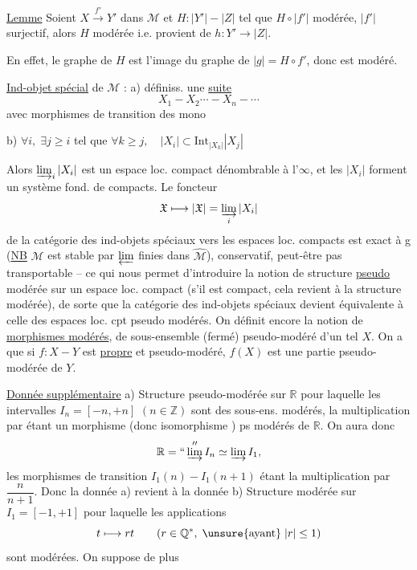 \uline{Lemme} Soient $X\xrightarrow{f'}Y'$ dans $\mathcal M$ et $H:|Y'|-|Z|$ tel que $H\circ|f'|$ modérée,  $|f'|$ surjectif, alors $H$ modérée i.e. provient de $h:Y'\longrightarrow|Z|$.

En effet,  le graphe de $H$ est l'image du graphe de $|g|=H\circ f'$, donc est modéré.


\uline{Ind-objet spécial}\inserted{$*$} de $\mathcal M$ : a) définiss.  une \uline{suite}
\[
X_1-X_2\cdots-X_n-\cdots
\]
avec morphismes de transition des mono

b) $\forall i,\;\exists j\geq i$ tel que $\forall k\geq j,\quad |X_i|\subset\mathrm{Int}_{|X_k|}|X_j|$


Alors $\varinjlim_i|X_i|$ est un espace loc. compact dénombrable à l'$\infty$, et les $|X_i|$ forment un système fond. de compacts. Le foncteur
\[
\mathfrak X\longmapsto|\mathfrak X|=\varinjlim_i|X_i|
\]
de la catégorie  des ind-objets spéciaux  vers les espaces loc. compacts est exact à g (\uline{NB} $\mathcal M$ est stable par $\varprojlim$ finies dans $\widehat{\mathcal M}$), conservatif, peut-être pas transportable -- ce qui nous permet d'introduire la notion de structure \uline{pseudo} modérée sur un espace loc. compact (s'il est compact, cela revient à la structure modérée), de sorte que la catégorie des ind-objets spéciaux devient équivalente à celle des espaces loc. cpt pseudo modérés. On définit encore la notion de \uline{morphismes  modérés}, de sous-ensemble (fermé) pseudo-modéré d'un tel $X$. On a que si $f:X-Y$ est \uline{propre} et pseudo-modéré, $f(X)$ est une partie pseudo-modérée de $Y$.

\uline{Donnée supplémentaire} a) Structure pseudo-modérée sur $\mathbb R$ pour laquelle les intervalles $I_n=[-n,+n]$ $(n\in\mathbb Z)$ sont des sous-ens.  modérés, la multiplication par  étant un morphisme (donc isomorphisme ) ps modérés  de $\mathbb R$. On aura donc
\[
\mathbb R=``\varinjlim'' I_n\simeq\varinjlim I_1,
\]
les morphismes de transition $I_1(n)-I_1(n+1)$ étant la multiplication par $\dfrac n{n+1}$.
Donc la donnée a) revient à la donnée b) Structure modérée sur $I_1=[-1,+1]$ pour laquelle les applications
\[
t\longmapsto rt\qquad(r\in\mathbb Q^*,\;\unsure{\text{ayant}}\;|r|\leq1)
\]
sont modérées. On suppose de plus

